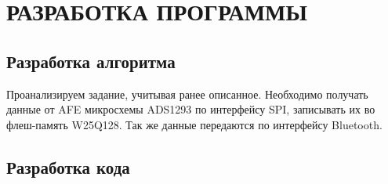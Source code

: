 \begin{sloppypar} %
\newpage %
\section{РАЗРАБОТКА ПРОГРАММЫ} %
\subsection{Разработка алгоритма}

Проанализируем задание, учитывая ранее описанное. Необходимо получать данные от \ac{AFE} микросхемы ADS1293 по интерфейсу SPI, записывать их во флеш-память W25Q128. Так же данные передаются по интерфейсу Bluetooth.

 











\subsection{Разработка кода}


\end{sloppypar}
